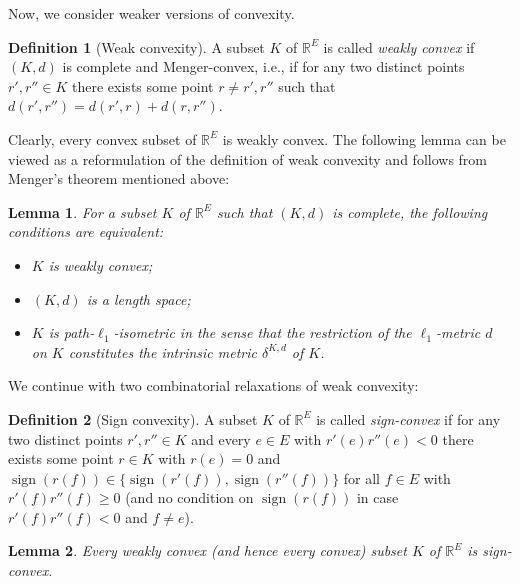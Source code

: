 \documentclass[11pt,a4paper]{amsart}
\newtheorem{lemma}{Lemma}
\theoremstyle{definition}
\newtheorem{definition}{Definition}
\numberwithin{equation}{section}
\DeclareMathOperator{\sign}{sign}
\begin{document}
 Now, we consider  weaker versions of convexity.

\begin{definition} [Weak convexity] A subset $K$ of  ${\mathbb R}^E$ is called \emph{weakly convex} if $(K,d)$ is complete and Menger-convex, i.e., if for any two distinct points $r',r''\in K$ there exists some point $r\ne r',r''$ such that $d(r',r'')=d(r',r)+d(r,r'')$.
\end{definition}

Clearly, every convex subset of ${\mathbb R}^E$ is weakly convex. The following lemma can be viewed as a reformulation of the definition of weak convexity and follows from Menger's  theorem \cite{Me}
mentioned above:

\begin{lemma} \label{weak-convexity} For a subset $K$ of ${\mathbb R}^E$ such that $(K,d)$ is complete, the following conditions are equivalent:
\begin{itemize}
\item[\rm{(i)}] $K$ is weakly convex;
\item[\rm{(ii)}] $(K,d)$ is a length space;
\item[\rm{(iii)}] $K$ is {\it path-$\ell_1$-isometric} in the sense that the restriction of the $\ell_1$-metric $d$ on $K$ constitutes the intrinsic metric $\delta^{K,d}$ of $K$.
\end{itemize}
\end{lemma}

We continue with two combinatorial relaxations of weak convexity:

\begin{definition} [Sign convexity]
A subset $K$ of ${\mathbb R}^E$ is called \emph{sign-convex} if for any two distinct points $r',r''\in K$ and every $e\in E$ with $r'(e)r''(e)<0$ there exists some point $r\in K$ with $r(e)=0$ and $\sign(r(f))\in \{ \sign(r'(f)),\sign(r''(f))\}$ for all $f\in E$ with $r'(f)r''(f)\ge 0$ (and no condition on $\sign(r(f))$ in case $r'(f)r''(f)<0$ and $f\ne e$).
\end{definition}



\begin{lemma} \label{weakconv->signconv} Every weakly convex (and hence every convex) subset $K$ of  ${\mathbb R}^E$ is sign-convex.
\end{lemma}
\end{document}
